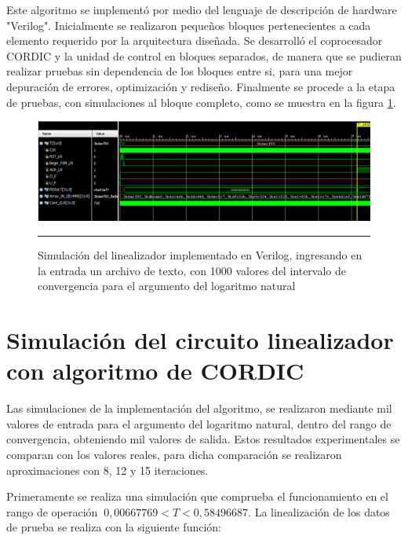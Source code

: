 Este algoritmo se implementó por medio del lenguaje de descripción de hardware "Verilog". Inicialmente se realizaron pequeños bloques pertenecientes a cada elemento requerido por la arquitectura diseñada. Se desarrolló el coprocesador CORDIC y la unidad de control en bloques separados, de manera que se pudieran realizar pruebas sin dependencia de los bloques entre si, para una mejor depuración de errores, optimización y rediseño. Finalmente se procede a la etapa de pruebas, con simulaciones al bloque completo, como se muestra en la figura \ref{fig:SIMLINEAL}. 

\begin{figure}[H]
  \centering
    \includegraphics[scale=0.75]{./TEST_LINEALIZADOR_I.png}
    \rule{35em}{0.5pt}
  \caption[Simulación del linealizador implementado en Verilog, ingresando en la entrada un archivo de texto, con 1000 valores del intervalo de convergencia para el argumento del logaritmo natural]{Simulación del linealizador implementado en Verilog, ingresando en la entrada un archivo de texto, con 1000 valores del intervalo de convergencia para el argumento del logaritmo natural}
  \label{fig:SIMLINEAL}
\end{figure}   

\section{Simulación del circuito linealizador con algoritmo de CORDIC}

Las simulaciones de la implementación del algoritmo, se realizaron mediante mil valores de entrada para el argumento del logaritmo natural, dentro del rango de convergencia, obteniendo mil valores de salida. Estos resultados experimentales se comparan con los valores reales, para dicha comparación se realizaron aproximaciones con 8, 12 y 15 iteraciones. 

Primeramente se realiza una simulación que comprueba el funcionamiento en el rango de operación $\ 0,00667769 < T < 0,58496687 $. La linealización de los datos de prueba se realiza con la siguiente función: 

